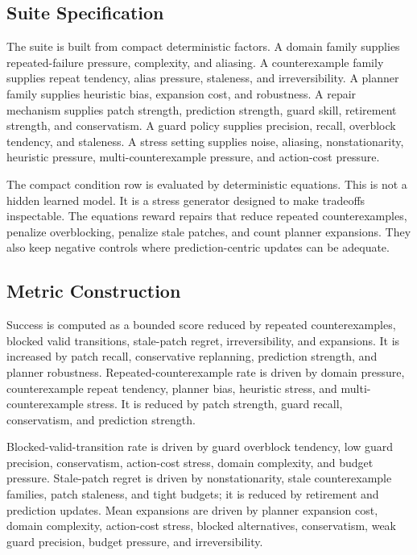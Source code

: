 \documentclass{article}
\begin{document}
\subsection{Suite Specification}

The suite is built from compact deterministic factors. A domain family supplies
repeated-failure pressure, complexity, and aliasing. A counterexample family
supplies repeat tendency, alias pressure, staleness, and irreversibility. A
planner family supplies heuristic bias, expansion cost, and robustness. A
repair mechanism supplies patch strength, prediction strength, guard skill,
retirement strength, and conservatism. A guard policy supplies precision,
recall, overblock tendency, and staleness. A stress setting supplies noise,
aliasing, nonstationarity, heuristic pressure, multi-counterexample pressure,
and action-cost pressure.

The compact condition row is evaluated by deterministic equations. This is not
a hidden learned model. It is a stress generator designed to make tradeoffs
inspectable. The equations reward repairs that reduce repeated
counterexamples, penalize overblocking, penalize stale patches, and count
planner expansions. They also keep negative controls where prediction-centric
updates can be adequate.

\subsection{Metric Construction}

Success is computed as a bounded score reduced by repeated counterexamples,
blocked valid transitions, stale-patch regret, irreversibility, and expansions.
It is increased by patch recall, conservative replanning, prediction strength,
and planner robustness. Repeated-counterexample rate is driven by domain
pressure, counterexample repeat tendency, planner bias, heuristic stress, and
multi-counterexample stress. It is reduced by patch strength, guard recall,
conservatism, and prediction strength.

Blocked-valid-transition rate is driven by guard overblock tendency, low guard
precision, conservatism, action-cost stress, domain complexity, and budget
pressure. Stale-patch regret is driven by nonstationarity, stale counterexample
families, patch staleness, and tight budgets; it is reduced by retirement and
prediction updates. Mean expansions are driven by planner expansion cost,
domain complexity, action-cost stress, blocked alternatives, conservatism, weak
guard precision, budget pressure, and irreversibility.
\end{document}
